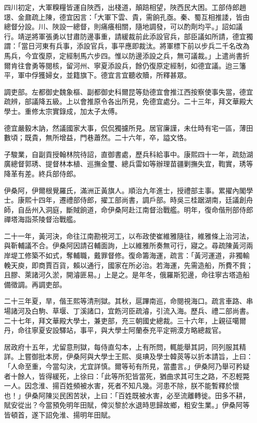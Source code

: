 \begin{pinyinscope}
四川初定，大軍糗糧皆運自陜西，出棧道，顛踣相望，陜西民大困。工部侍郎趙璟、金鼐疏上陳，德宜因言：「大軍下雲、貴，需餉孔亟。秦、蜀互相推諉，皆由總督分設。川、陜設一總督，則痛癢相關，隨地調發，可以酌劑均平。」詔如議行。靖逆將軍張勇以甘肅防邊事重，請緩裁前此添設官兵，部臣議如所請，德宜獨謂：「當日河東有兵事，添設官兵，事平應即裁汰。將軍標下前以步兵二千名改為馬兵，今宜復原，定經制馬六步四。惟以防邊添設之兵，無可議裁。」上遣尚書折爾肯往會勇等閱核，留河州、寧夏添設兵，餘仍復原定經制，如德宜議。迨三籓平，軍中俘獲婦女，並籍旗下。德宜言宜聽收贖，所釋甚眾。

調吏部。左都御史魏象樞、副都御史科爾昆等劾德宜會推江西按察使事失當，德宜疏辨，部議降五級。上以會推原令各出所見，免德宜處分。二十三年，拜文華殿大學士。重修太宗實錄成，加太子太傅。

德宜嚴毅木訥，然議國家大事，侃侃獨攄所見。居官廉謹，未仕時有宅一區，薄田數頃；既貴，無所增益，門巷蕭然。二十六年，卒，謚文恪。

子駿業，自副貢授翰林院待詔，直御書處，歷兵科給事中。康熙四十一年，疏劾湖廣總督郭琇、提督林本植、巡撫金璽、總兵雷如等辦理苗疆剿撫失宜，鞫實，琇等降革有差。終兵部侍郎。

伊桑阿，伊爾根覺羅氏，滿洲正黃旗人。順治九年進士，授禮部主事。累擢內閣學士。康熙十四年，遷禮部侍郎，擢工部尚書，調戶部。時吳三桂踞湖南，廷議創舟師，自岳州入洞庭，斷賊餉道，命伊桑阿赴江南督治戰艦。明年，復命偕刑部侍郎禪塔海詣茶陵督治戰艦。

二十一年，黃河決，命往江南勘視河工，以布政使崔維雅隨往，維雅條上治河法，與靳輔議不合。伊桑阿因請召輔面詢，上以維雅所奏無可行，寢之。尋疏陳黃河兩岸堤工修築不如式，奪輔職，戴罪督修。復命籌海運，疏言：「黃河運道，非獨輸輓天庾，即商賈百貨，賴以通行，國家在所必治。若海運，先需造船，所費不貲；且膠、萊諸河久淤，開濬匪易。」上是之。是年冬，俄羅斯犯邊，命往寧古塔造船備徵調。再調吏部。

二十三年夏，旱，偕王熙等清刑獄。其秋，扈蹕南巡，命閱視海口。疏言車路、串場諸河及白駒、草堰、丁溪諸口，宜飭河臣疏濬，引流入海。歷兵、禮二部尚書。二十七年，拜文華殿大學士，兼吏部，充三朝國史總裁。三十六年，上親征噶爾丹，命往寧夏安設驛站，事平，與大學士阿蘭泰充平定朔漠方略總裁官。

居政府十五年，尤留意刑獄，每侍直勾本，上有所問，輒能舉其詞，同列服其精詳。上嘗御批本房，伊桑阿與大學士王熙、吳琠及學士韓菼等以折本請旨，上曰：「人命至重，今當勾決，尤宜詳慎。爾等茍有所見，當盡言。」伊桑阿乃舉可矜疑者十餘人，皆得緩死，上徐曰：「此等所犯皆當死，猶曲求其可生之路，不忍輕斃一人。因念淮、揚百姓頻被水害，死者不知凡幾。河患不除，朕不能暫釋於懷也！」伊桑阿陳災民困苦狀，上曰：「百姓既被水害，必至流離轉徙。田多不耕，賦安從出？今當預免明年田賦，俾災黎於水退時思歸故鄉，粗安生業。」伊桑阿等皆頓首，遂下詔免淮、揚明年田賦。


\end{pinyinscope}
